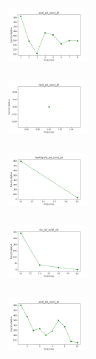 \begin{figure}[H]
\begin{subfigure}
    \end{subfigure}
    \hfill
    \begin{subfigure}
        \centering
        \includegraphics[width=0.234\textwidth]{img/copkm/ecoli_set_const_20_589741062_cost.png}
    \end{subfigure}
    \hfill
    \begin{subfigure}
        \centering
        \includegraphics[width=0.234\textwidth]{img/copkm/rand_set_const_20_589741062_cost.png}
    \end{subfigure}
    \hfill
    \begin{subfigure}
        \centering
        \includegraphics[width=0.234\textwidth]{img/copkm/newthyroid_set_const_20_589741062_cost.png}
    \end{subfigure}
    \hfill
    \begin{subfigure}
        \centering
        \includegraphics[width=0.234\textwidth]{img/copkm/iris_set_const_20_277451237_cost.png}
    \end{subfigure}
    \hfill
    \begin{subfigure}
        \centering
        \includegraphics[width=0.234\textwidth]{img/copkm/ecoli_set_const_20_277451237_cost.png}
    \end{subfigure}
    \hfill

\end{figure}
